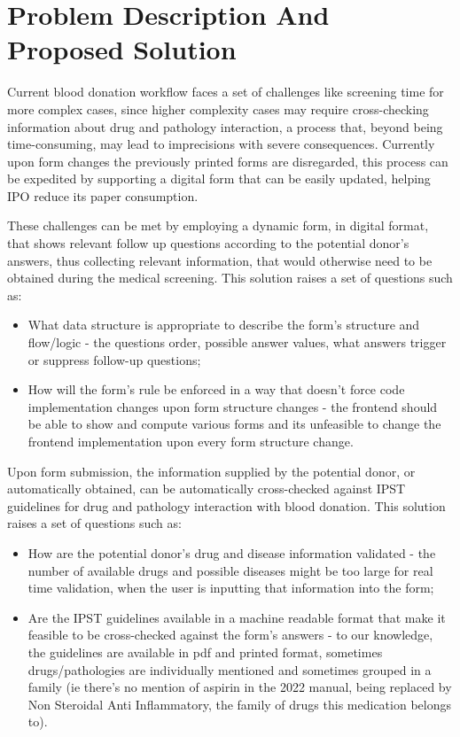 %
%
\chapter{Problem Description And Proposed Solution} \label{cap:problem_description}

Current blood donation workflow faces a set of challenges like screening time for more complex cases, since higher complexity cases may require cross-checking information about drug and pathology interaction, a process that, beyond being time-consuming,  may lead to imprecisions with severe consequences. Currently upon form changes the previously printed forms are disregarded, this process can be expedited by supporting a digital form that can be easily updated, helping IPO reduce its paper consumption.

These challenges can be met by employing a dynamic form, in digital format, that shows relevant follow up questions according to the potential donor's answers, thus collecting relevant information, that would otherwise need to be obtained during the medical screening.
This solution raises a set of questions such as:
\begin{itemize}
	\item What data structure is appropriate to describe the form's structure and flow/logic - 
	the questions order, possible answer values, what answers trigger or suppress follow-up questions;
	\item How will the form's rule be enforced in a way that doesn't force code implementation changes upon form structure changes - the frontend should be able to show and compute various forms and its unfeasible to change the frontend implementation upon every form structure change.
\end{itemize}

Upon form submission, the information supplied by the potential donor, or automatically obtained, can be automatically cross-checked against IPST guidelines for drug and pathology interaction with blood donation.
This solution raises a set of questions such as:
\begin{itemize}
	\item How are the potential donor's drug and disease information validated - the number of available drugs and possible diseases might be too large for real time validation, when the user is inputting that information into the form;
	\item Are the IPST guidelines available in a machine readable format that make it feasible to be cross-checked against the form's answers - to our knowledge, the guidelines are available in pdf and printed format, sometimes drugs/pathologies are individually mentioned and sometimes grouped in a family (ie there's no mention of aspirin in the 2022 manual, being replaced by Non Steroidal Anti Inflammatory, the family of drugs this medication belongs to).
\end{itemize}

